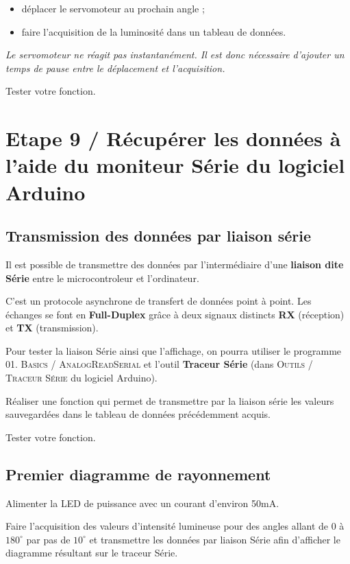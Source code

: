 \documentclass[a4paper,11pt,titlepage]{article} %
\begin{document}
\begin{itemize}
	\item déplacer le servomoteur au prochain angle ;
	\item faire l'acquisition de la luminosité dans un tableau de données.
\end{itemize}

\textit{Le servomoteur ne réagit pas instantanément. Il est donc nécessaire d'ajouter un temps de pause entre le déplacement et l'acquisition.}

\Manip Tester votre fonction.


\section{Etape 9 / Récupérer les données à l'aide du moniteur Série du logiciel Arduino}

\subsection{Transmission des données par liaison série}

Il est possible de transmettre des données par l'intermédiaire d'une \textbf{liaison dite Série} entre le microcontroleur et l'ordinateur.

C'est un protocole asynchrone de transfert de données point à point. Les échanges se font en \textbf{Full-Duplex} grâce à deux signaux distincts \textbf{RX} (réception) et \textbf{TX} (transmission).

\medskip

Pour tester la liaison Série ainsi que l'affichage, on pourra utiliser le programme \textsc{01. Basics / AnalogReadSerial} et l'outil \textbf{Traceur Série} (dans \textsc{Outils / Traceur Série} du logiciel Arduino).


\Manip Réaliser une fonction qui permet de transmettre par la liaison série les valeurs sauvegardées dans le tableau de données précédemment acquis.

\Manip Tester votre fonction.

\subsection{Premier diagramme de rayonnement}

\Manip Alimenter la LED de puissance avec un courant d'environ 50mA.

\Manip Faire l'acquisition des valeurs d'intensité lumineuse pour des angles allant de $0$ à $180^\circ{}$ par pas de $10^\circ{}$ et transmettre les données par liaison Série afin d'afficher le diagramme résultant sur le traceur Série.
\end{document}
